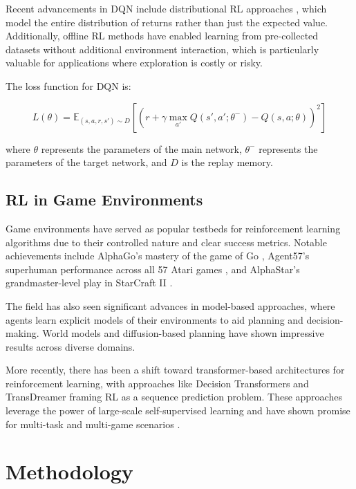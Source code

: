 \documentclass[conference]{IEEEtran}
\begin{document}
Recent advancements in DQN include distributional RL approaches \cite{dabney2020distributional}, which model the entire distribution of returns rather than just the expected value. Additionally, offline RL methods \cite{kumar2023offline, fujimoto2021minimalist, wang2022offline} have enabled learning from pre-collected datasets without additional environment interaction, which is particularly valuable for applications where exploration is costly or risky.

The loss function for DQN is:

\begin{equation}
L(\theta) = \mathbb{E}_{(s,a,r,s') \sim D} [(r + \gamma \max_{a'} Q(s', a'; \theta^-) - Q(s, a; \theta))^2]
\end{equation}

where $\theta$ represents the parameters of the main network, $\theta^-$ represents the parameters of the target network, and $D$ is the replay memory.

\subsection{RL in Game Environments}
Game environments have served as popular testbeds for reinforcement learning algorithms due to their controlled nature and clear success metrics. Notable achievements include AlphaGo's mastery of the game of Go \cite{silver2017mastering}, Agent57's superhuman performance across all 57 Atari games \cite{badia2020agent57}, and AlphaStar's grandmaster-level play in StarCraft II \cite{vinyals2019grandmaster}.

The field has also seen significant advances in model-based approaches, where agents learn explicit models of their environments to aid planning and decision-making. World models \cite{hafner2023mastering} and diffusion-based planning \cite{yu2022planning} have shown impressive results across diverse domains.

More recently, there has been a shift toward transformer-based architectures for reinforcement learning, with approaches like Decision Transformers \cite{chen2021decision} and TransDreamer \cite{chen2021transdreamer} framing RL as a sequence prediction problem. These approaches leverage the power of large-scale self-supervised learning and have shown promise for multi-task and multi-game scenarios \cite{lee2022multi}.

\section{Methodology}
\label{sec:methodology}
\end{document}

